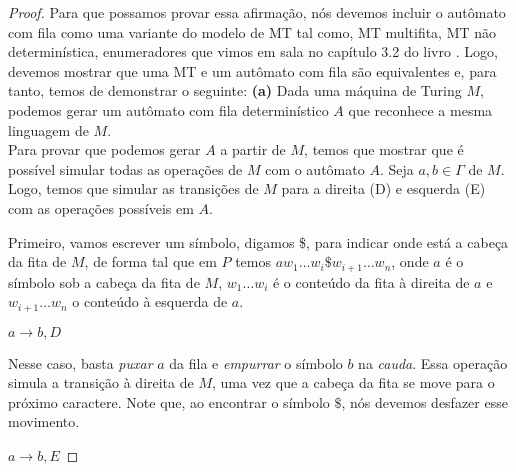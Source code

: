\begin{proof}
Para que possamos provar essa afirmação, nós devemos incluir o autômato com fila como uma variante do modelo de MT tal como, MT multifita, MT não determinística, enumeradores que vimos em sala no capítulo 3.2 do livro \cite{sipser:2006}. Logo, devemos mostrar que uma MT e um autômato com fila são equivalentes e, para tanto, temos de demonstrar o seguinte:
\vskip 0.1in
\textbf{(a)} Dada uma máquina de Turing $M$, podemos gerar um autômato com fila determinístico $A$ que reconhece a mesma linguagem de $M$.\\[3pt]
Para provar que podemos gerar $A$ a partir de $M$, temos que mostrar que é possível simular todas as operações de $M$ com o autômato $A$. Seja $a, b \in \Gamma$ de $M$. Logo, temos que simular as transições de $M$ para a direita (D) e esquerda (E) com as operações possíveis em $A$.

Primeiro, vamos escrever um símbolo, digamos \$, para indicar onde está a cabeça da fita de $M$, de forma tal que em $P$ temos $aw_1 \ldots  w_i\$w_{i+1} \ldots w_n$, onde $a$ é o símbolo sob a cabeça da fita de $M$, $w_1 \ldots w_i$ é o conteúdo da fita à direita de $a$ e $w_{i+1} \ldots w_n$ o conteúdo à esquerda de $a$.

$a \rightarrow b, D$

Nesse caso, basta \textit{puxar} $a$ da fila e \textit{empurrar} o símbolo $b$ na \textit{cauda}. Essa operação simula a transição à direita de $M$, uma vez que a cabeça da fita se move para o próximo caractere. Note que, ao encontrar o símbolo $\$$, nós devemos desfazer esse movimento.

$a \rightarrow b, E$


\end{proof}
